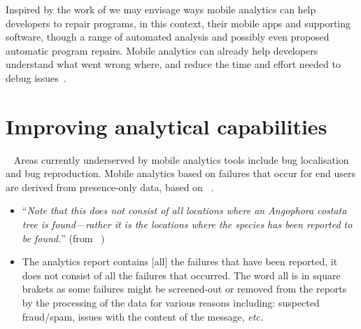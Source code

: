 Inspired by the work of  we may envisage ways mobile analytics can help developers to repair programs, in this context, their mobile apps and supporting software, though a range of automated analysis and possibly even proposed automatic program repairs. Mobile analytics can already help developers understand what went wrong where, and reduce the time and effort needed to debug issues~.



\section{Improving analytical capabilities}~\label{discussion-improving-mobile-analytics}
Areas currently underserved by mobile analytics tools include bug localisation and bug reproduction. Mobile analytics based on failures that occur for end users are derived from presence-only data, based on ~. 

\begin{itemize}
    \item``\emph{Note that this does not consist of all locations where an Angophora costata tree is found—rather it is the locations where the species has been reported to be found.}'' (from ~)
    \item The analytics report contains [all] the failures that have been reported, it does not consist of all the failures that occurred. The word all is in square brakets as some failures might be screened-out or removed from the reports by the processing of the data for various reasons including: suspected fraud/spam, issues with the content of the message, \emph{etc.}
\end{itemize}
\afterpage{\clearpage}

